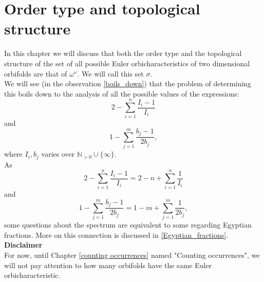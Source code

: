 \chapter{Order type and topological structure} \label{order structure}
%
%
%
In this chapter we will discuss that both the order type and the topological structure 
of the set of all possible Euler orbicharacteristics 
of two dimensional orbifolds are that of $\omega^\omega$. We will call this set $\sigma$. \\ 
We will see (in the observation \ref{boils_down}) that the problem of determining this boils
 down to the 
 analysis of all 
the possible 
values of the expressions:
\begin{equation}
2 - \sum_{i=1}^n \frac{I_i-1}{I_i}
\end{equation}
and 
\begin{equation}
1 - \sum_{j=1}^m \frac{b_j-1}{2b_j},
\end{equation}
where $I_i, b_j$ varies over $\mathbb{N}_{>0} \cup \{\infty\}$. \\
As
\begin{equation}
2 - \sum_{i=1}^n \frac{I_i-1}{I_i} = 2 - n + \sum_{i=1}^n \frac{1}{I_i}
\end{equation}
and 
\begin{equation}
1 - \sum_{j=1}^m \frac{b_j-1}{2b_j} = 1 - m + \sum_{j=1}^m \frac{1}{2b_j},
\end{equation}
some questions about the spectrum are equivalent to some regarding Egyptian fractions. 
More on this connection is discussed in \ref{Egyptian_fractions}.
\\[16pt]
\textbf{Disclaimer}\\
For now, until Chapter \ref{counting occurrences} named "Counting occurrences", 
we will not pay attention 
to how many orbifolds have the same Euler orbicharacteristic. 


